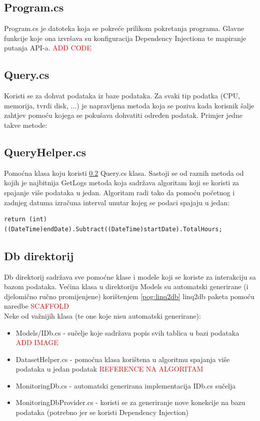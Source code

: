 \documentclass[zavrsnirad]{fer}
\begin{document}
\subsection{Program.cs}
Program.cs je datoteka koja se pokreće prilikom pokretanja programa. Glavne funkcije koje ona izvršava su konfiguracija Dependency Injectiona te mapiranje putanja API-a.
\textcolor{red}{ADD CODE}

\subsection{Query.cs}
\label{pog:query.cs}
Koristi se za dohvat podataka iz baze podataka. Za svaki tip podatka (CPU, memorija, tvrdi disk, ...) je napravljena metoda koja se poziva kada korisnik šalje zahtjev pomoću kojega se pokušava dohvatiti određen podatak. Primjer jedne takve metode:


\subsection{QueryHelper.cs}
Pomoćna klasa koju koristi \ref{pog:query.cs} Query.cs klasa. Sastoji se od raznih metoda od kojih je najbitnija GetLogs metoda koja sadržava algoritam koji se koristi za spajanje više podataka u jedan. Algoritam radi tako da pomoću početnog i zadnjeg datuma izračuna interval unutar kojeg se podaci spajaju u jedan:
\begin{lstlisting}[language=CSharp, title=Izračun intervala]
return (int)((DateTime)endDate).Subtract((DateTime)startDate).TotalHours;
\end{lstlisting}



\subsection{Db direktorij}
Db direktorij sadržava sve pomoćne klase i modele koji se koriste za interakciju sa bazom podataka. Većina klasa u direktoriju Models su automatski generirane (i djelomično ručno promijenjene) korištenjem \ref{pog:linq2db} linq2db paketa pomoću naredbe \textcolor{red}{SCAFFOLD}
\\Neke od važnijih klasa (te one koje nisu automatski generirane):
\begin{itemize}
	\item Models/IDb.cs - sučelje koje sadržava popis svih tablica u bazi podataka \textcolor{red}{ADD IMAGE}
	\item DatasetHelper.cs - pomoćna klasa korištena u algoritmu spajanja više podataka u jedan podatak \textcolor{red}{REFERENCE NA ALGORITAM}
	\item MonitoringDb.cs - automatski generirana implementacija IDb.cs sučelja
	\item MonitoringDbProvider.cs - koristi se za generiranje nove konekcije na bazu podataka (potrebno jer se koristi Dependency Injection)
\end{itemize}
\end{document}
